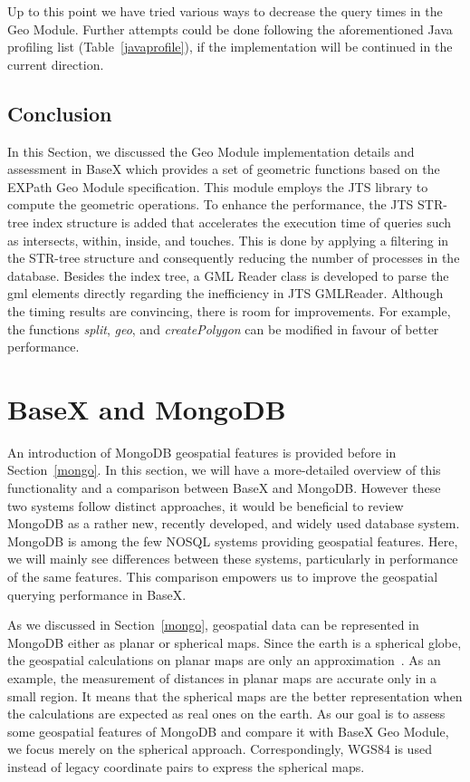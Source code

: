 \documentclass[a4paper,12pt]{article}
\begin{document}
Up to this point we have tried various ways to decrease the query times in the Geo Module. Further attempts could be done following the aforementioned Java profiling list (Table~\ref{javaprofile}), if the implementation will be continued in the current direction.

\subsection{Conclusion}
\label{BXconc}
In this Section, we discussed the Geo Module implementation details and assessment in BaseX which provides a set of geometric functions based on the EXPath Geo Module specification. This module employs the JTS library to compute the geometric operations. To enhance the performance, the JTS STR-tree index structure is added that accelerates the execution time of queries such as intersects, within, inside, and touches. This is done by applying a filtering in the STR-tree structure and consequently reducing the number of processes in the database. Besides the index tree, a GML Reader class is developed to parse the gml elements directly regarding the inefficiency in JTS GMLReader. Although the timing results are convincing, there is room for improvements. For example, the functions \textit{split}, \textit{geo}, and \textit{createPolygon} can be modified in favour of better performance.

\newpage
\section{BaseX and MongoDB}
\label{s.mongo}

An introduction of MongoDB geospatial features is provided before in Section~\ref{mongo}. In this section, we will have a more-detailed overview of this functionality and a comparison between BaseX and MongoDB. However these two systems follow distinct approaches, it would be beneficial to review MongoDB as a rather new, recently developed, and widely used database system. MongoDB is among the few NOSQL systems providing geospatial features. Here, we will mainly see differences between these systems, particularly in performance of the same features. This comparison empowers us to improve the geospatial querying performance in BaseX. 

As we discussed in Section~\ref{mongo}, geospatial data can be represented in MongoDB either as planar or spherical maps. Since the earth is a spherical globe, the geospatial calculations on planar maps are only an approximation~\cite{coordsys,coordsys-mongo}. As an example, the measurement of distances in planar maps are accurate only in a small region. It means that the spherical maps are the better representation when the calculations are expected as real ones on the earth. As our goal is to assess some geospatial features of MongoDB and compare it with BaseX Geo Module, we focus merely on the spherical approach. Correspondingly, WGS84 is used instead of legacy coordinate pairs to express the spherical maps. 
\end{document}
